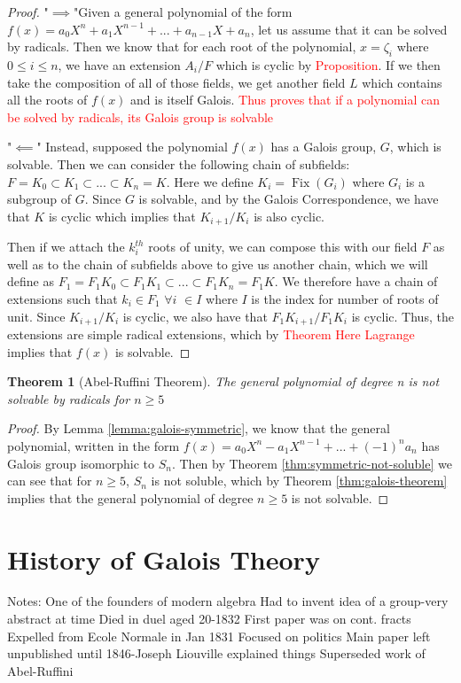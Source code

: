 \documentclass[12pt]{article}
\newtheorem{theorem}{Theorem}
\theoremstyle{definition}
\newcommand{\Fix}{\operatorname{Fix}}
\begin{document}
\begin{proof}
    "$\implies $"Given a general polynomial of the form $f(x) = a_0X^n +a_1X^{n-1}+...+a_{n-1}X+a_n$, let us assume that it can be solved by radicals. Then we know that for each root of the polynomial, $x=\zeta_i$ where $0\leq i \leq n$, we have an extension $A_i/F$ which is cyclic by \textcolor{red}{Proposition}. If we then take the composition of all of those fields, we get another field $L$ which contains all the roots of $f(x)$ and is itself Galois. 
    \textcolor{red}{Thus proves that if a polynomial can be solved by radicals, its Galois group is solvable}

    "$\impliedby$" Instead, supposed the polynomial $f(x)$ has a Galois group, $G$, which is solvable. Then we can consider the following chain of subfields: $F=K_0\subset K_1 \subset ... \subset K_n = K$. Here we define $K_i = \Fix(G_i)$ where $G_i$ is a subgroup of $G$.
    Since $G$ is solvable, and by the Galois Correspondence, we have that $K$ is cyclic which implies that $K_{i+1}/K_i$ is also cyclic.

    Then if we attach the $k_i^{th}$ roots of unity, we can compose this with our field $F$ as well as to the chain of subfields above to give us another chain, which we will define as $F_1 = F_1K_0 \subset F_1K_1 \subset ... \subset F_1K_n = F_1K$. We therefore have a chain of extensions such that $k_i \in F_1$ $\forall i$ \hspace{0.1cm} $\in I$ where $I$ is the index for number of roots of unit. Since $K_{i+1}/K_i$ is cyclic, we also have that $F_1K_{i+1}/F_1K_i$ is cyclic. Thus, the extensions are simple radical extensions, which by \textcolor{red}{Theorem Here Lagrange} implies that $f(x)$ is solvable.
\end{proof}

\begin{theorem}[Abel-Ruffini Theorem]\label{thm:abel-ruffini-thm}
    The general polynomial of degree n is not solvable by radicals for $n \ge 5$
\end{theorem}

\begin{proof}
    By Lemma \ref{lemma:galois-symmetric}, we know that the general polynomial, written in the form $f(x)=a_0X^n - a_1X^{n-1} + ... + (-1)^na_n$ has Galois group isomorphic to $S_n$. Then by Theorem \ref{thm:symmetric-not-soluble} we can see that for $n \geq 5$, $S_n$ is not soluble, which by Theorem \ref{thm:galois-theorem} implies that the general polynomial of degree $n \geq 5$ is not solvable.
\end{proof}

\section{History of Galois Theory}

Notes:
One of the founders of modern algebra
Had to invent idea of a group-very abstract at time
Died in duel aged 20-1832
First paper was on cont. fracts
Expelled from Ecole Normale in Jan 1831
Focused on politics
Main paper left unpublished until 1846-Joseph Liouville explained things
Superseded work of Abel-Ruffini

\newpage

\end{document}
